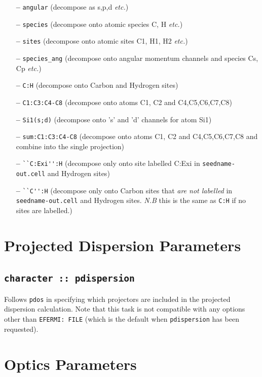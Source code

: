 \documentclass[a4paper,11pt,twoside]{book}
\begin{document}
{\begin{itemize}
\item[{\bf --}]  \verb#angular# (decompose as s,p,d \emph{etc.})
\item[{\bf --}]  \verb#species#    (decompose onto atomic species C, H \emph{etc.})
\item[{\bf --}]  \verb#sites#    (decompose onto atomic sites C1, H1, H2 \emph{etc.})
\item[{\bf --}]  \verb#species_ang#    (decompose onto angular momentum channels and species Cs, Cp \emph{etc.})
\item[{\bf --}]  \verb#C:H#     (decompose onto Carbon and Hydrogen sites)
\item[{\bf --}]  \verb#C1:C3:C4-C8#  (decompose onto atoms C1, C2 and C4,C5,C6,C7,C8)
\item[{\bf --}]  \verb#Si1(s;d)#     (decompose onto 's' and 'd' channels for
  atom Si1)
\item[{\bf --}]  \verb#sum:C1:C3:C4-C8#  (decompose onto atoms C1, C2 and C4,C5,C6,C7,C8 and combine into the single projection)
\item[{\bf --}]  \verb#``C:Exi'':H#  (decompose only onto site labelled C:Exi in \verb#seedname-out.cell# and Hydrogen sites)
\item[{\bf --}]  \verb#``C'':H#  (decompose only onto Carbon sites that \textit{are not labelled} in \verb#seedname-out.cell# and Hydrogen sites. \textit{N.B} this is the same as  \verb#C:H# if no sites are labelled.)


\end{itemize}

\section{Projected Dispersion Parameters}

\subsection[pdispersion]{\tt character :: pdispersion}
Follows \verb#pdos# in specifying which projectors are included in the projected
dispersion calculation. Note that this task is not compatible with any options
other than \verb#EFERMI: FILE# (which is the default when \verb#pdispersion# has
been requested).

\section{Optics Parameters}

}
\end{document}
